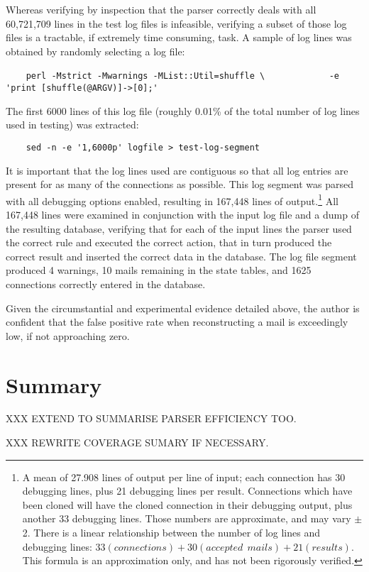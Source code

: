 Whereas verifying by inspection that the parser correctly deals with all
60,721,709 lines in the test log files is infeasible, verifying a subset of
those log files is a tractable, if extremely time consuming, task.  A
sample of log lines was obtained by randomly selecting a log file:

\verb!    perl -Mstrict -Mwarnings -MList::Util=shuffle \!\newline{}
\verb!            -e 'print [shuffle(@ARGV)]->[0];'!

The first 6000 lines of this log file (roughly 0.01\% of the total number
of log lines used in testing) was extracted:

\verb!    sed -n -e '1,6000p' logfile > test-log-segment!

It is important that the log lines used are contiguous so that all log
entries are present for as many of the connections as possible.  This log
segment was parsed with all debugging options enabled, resulting in 167,448
lines of output.\footnote{A mean of 27.908 lines of output per line of
input; each connection has 30 debugging lines, plus 21 debugging lines per
result.  Connections which have been cloned will have the cloned connection
in their debugging output, plus another 33 debugging lines.  Those numbers
are approximate, and may vary $\pm{}$ 2.  There is a linear relationship
between the number of log lines and debugging lines: $33(connections) +
30(accepted~~mails) + 21(results)$.  This formula is an approximation only,
and has not been rigorously verified.}  All 167,448 lines were examined in
conjunction with the input log file and a dump of the resulting database,
verifying that for each of the input lines the parser used the correct rule
and executed the correct action, that in turn produced the correct result
and inserted the correct data in the database.  The log file segment
produced 4 warnings, 10 mails remaining in the state tables, and 1625
connections correctly entered in the database.

Given the circumstantial and experimental evidence detailed above, the
author is confident that the false positive rate when reconstructing a mail
is exceedingly low, if not approaching zero.

\section{Summary}

XXX EXTEND TO SUMMARISE PARSER EFFICIENCY TOO\@.

XXX REWRITE COVERAGE SUMARY IF NECESSARY\@.

